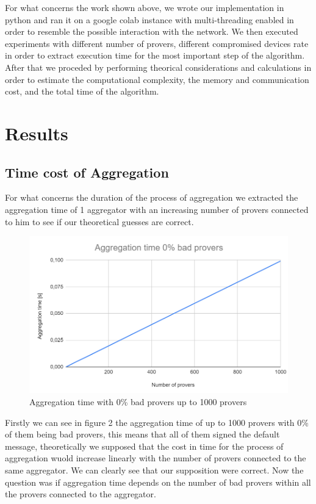 \documentclass[10pt, a4paper, twocolumn]{article} %
\begin{document}
For what concerns the work shown above, we wrote our implementation in python and ran it on a google colab instance with multi-threading enabled in order to resemble the possible interaction with the network.
We then executed experiments with different number of provers, different compromised devices rate in order to extract execution time for the most important step of the algorithm.
After that we proceded by performing theorical considerations and calculations in order to estimate the computational complexity, the memory and communication cost, and the total time of the algorithm.

\section{Results}
\subsection{Time cost of Aggregation}
For what concerns the duration of the process of aggregation we extracted the aggregation time of 1 aggregator with an increasing number of provers connected to him to see if our theoretical guesses are correct.
\begin{figure}
	\includegraphics[width=\linewidth]{images/aggregation_0.png} %
	\caption{Aggregation time with 0\% bad provers up to 1000 provers} %
	\label{bear} %
\end{figure}

Firstly we can see in figure 2 the aggregation time of up to 1000 provers with 0\% of them being bad provers, this means that all of them signed the default message, theoretically we supposed that the cost in time 
for the process of aggregation wuold increase linearly with the number of provers connected to the same aggregator. We can clearly see that our supposition were correct.
Now the question was if aggregation time depends on the number of bad provers within all the provers connected to the aggregator.\\
\end{document}
